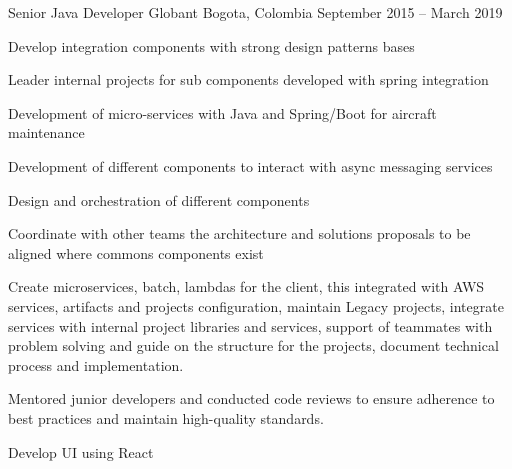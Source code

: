 \begin{cventries}
  \cventry
    {Senior Java Developer} %
    {Globant} %
    {Bogota, Colombia} %
    {September 2015 – March 2019} %
    {
      \begin{cvitems} %
        \item {Develop integration components with strong design patterns bases}
        \item {Leader internal projects for sub components developed with spring integration}
        \item {Development of micro-services with Java and Spring/Boot for aircraft maintenance}
        \item {Development of different components to interact with async messaging services}
        \item {Design and orchestration of different components}
        \item {Coordinate with other teams the architecture and solutions proposals to be aligned where commons components exist}
        \item {Create microservices, batch, lambdas for the client, this integrated with AWS services, artifacts and projects configuration, maintain Legacy projects, integrate services with internal project libraries and services, support of teammates with problem solving and guide on the structure for the projects, document technical process and implementation.}
        \item {Mentored junior developers and conducted code reviews to ensure adherence to best practices and maintain high-quality standards.}
        \item {Develop UI using React}
      \end{cvitems}
    }


\end{cventries}
